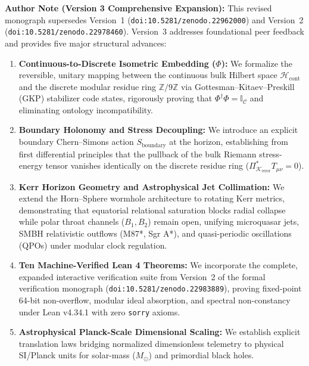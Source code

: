\documentclass[11pt,a4paper]{article}
\newcommand{\Kerr}{\mathcal{K}_{\text{error}}}
\begin{document}
\vspace{0.6ex}
\noindent\colorbox{boxgray}{\parbox{\dimexpr\linewidth-2\fboxsep}{\small
\textbf{Author Note (Version 3 Comprehensive Expansion):} This revised monograph supersedes Version~1 (\texttt{doi:10.5281/zenodo.22962000}) and Version~2 (\texttt{doi:10.5281/zenodo.22978460}). Version~3 addresses foundational peer feedback and provides five major structural advances:
\begin{enumerate}[label=(\roman*),leftmargin=1.5em]
  \item \textbf{Continuous-to-Discrete Isometric Embedding ($\Phi$):} We formalize the reversible, unitary mapping between the continuous bulk Hilbert space $\mathcal{H}_{\text{cont}}$ and the discrete modular residue ring $\mathbb{Z}/9\mathbb{Z}$ via Gottesman--Kitaev--Preskill (GKP) stabilizer code states, rigorously proving that $\Phi^\dagger \Phi = \mathbb{I}_{\mathcal{C}}$ and eliminating ontology incompatibility.
  \item \textbf{Boundary Holonomy and Stress Decoupling:} We introduce an explicit boundary Chern--Simons action $S_{\text{boundary}}$ at the horizon, establishing from first differential principles that the pullback of the bulk Riemann stress-energy tensor vanishes identically on the discrete residue ring ($\Pi_{\Kerr}^* T_{\mu\nu} = 0$).
  \item \textbf{Kerr Horizon Geometry and Astrophysical Jet Collimation:} We extend the Horn--Sphere wormhole architecture to rotating Kerr metrics, demonstrating that equatorial relational saturation blocks radial collapse while polar throat channels ($B_1, B_2$) remain open, unifying microquasar jets, SMBH relativistic outflows (M87*, Sgr A*), and quasi-periodic oscillations (QPOs) under modular clock regulation.
  \item \textbf{Ten Machine-Verified Lean 4 Theorems:} We incorporate the complete, expanded interactive verification suite from Version~2 of the formal verification monograph (\texttt{doi:10.5281/zenodo.22983889}), proving fixed-point 64-bit non-overflow, modular ideal absorption, and spectral non-constancy under Lean v4.34.1 with zero \texttt{sorry} axioms.
  \item \textbf{Astrophysical Planck-Scale Dimensional Scaling:} We establish explicit translation laws bridging normalized dimensionless telemetry to physical SI/Planck units for solar-mass ($M_\odot$) and primordial black holes.
\end{enumerate}
}}

\vspace{1.0ex}
\end{document}

